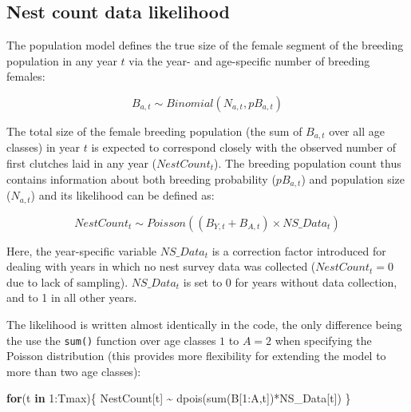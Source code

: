 \documentclass[
]{book}
\newenvironment{Shaded}{\begin{snugshade}}{\end{snugshade}}
\newcommand{\ControlFlowTok}[1]{\textcolor[rgb]{0.13,0.29,0.53}{\textbf{#1}}}
\newcommand{\DecValTok}[1]{\textcolor[rgb]{0.00,0.00,0.81}{#1}}
\newcommand{\FunctionTok}[1]{\textcolor[rgb]{0.00,0.00,0.00}{#1}}
\newcommand{\NormalTok}[1]{#1}
\newcommand{\SpecialCharTok}[1]{\textcolor[rgb]{0.00,0.00,0.00}{#1}}
\begin{document}
\hypertarget{nest-count-data-likelihood}{%
\subsection{Nest count data likelihood}\label{nest-count-data-likelihood}}

The population model defines the true size of the female segment of the breeding
population in any year \(t\) via the year- and age-specific number of breeding
females:

\begin{equation}
B_{a,t}  \sim Binomial(N_{a,t}, pB_{a,t})
\end{equation}

The total size of the female breeding population (the sum of \(B_{a,t}\) over all
age classes) in year \(t\) is expected to correspond closely with the observed
number of first clutches laid in any year (\(NestCount_t\)).
The breeding population count thus contains information about both breeding
probability (\(pB_{a,t}\)) and population size (\(N_{a,t}\)) and its likelihood can
be defined as:

\begin{equation}
NestCount_t  \sim Poisson((B_{Y,t} + B_{A,t}) \times NS\_Data_t)
\end{equation}

Here, the year-specific variable \(NS\_Data_t\) is a correction factor introduced
for dealing with years in which no nest survey data was collected
(\(NestCount_t = 0\) due to lack of sampling). \(NS\_Data_t\) is set to 0 for years
without data collection, and to 1 in all other years.

The likelihood is written almost identically in the code, the only difference
being the use the \texttt{sum()} function over age classes \(1\) to \(A=2\) when
specifying the Poisson distribution (this provides more flexibility for
extending the model to more than two age classes):

\begin{Shaded}
\begin{Highlighting}[]
\ControlFlowTok{for}\NormalTok{(t }\ControlFlowTok{in} \DecValTok{1}\SpecialCharTok{:}\NormalTok{Tmax)\{}
\NormalTok{  NestCount[t] }\SpecialCharTok{\textasciitilde{}} \FunctionTok{dpois}\NormalTok{(}\FunctionTok{sum}\NormalTok{(B[}\DecValTok{1}\SpecialCharTok{:}\NormalTok{A,t])}\SpecialCharTok{*}\NormalTok{NS\_Data[t])}
\NormalTok{\}}
\end{Highlighting}
\end{Shaded}
\end{document}
